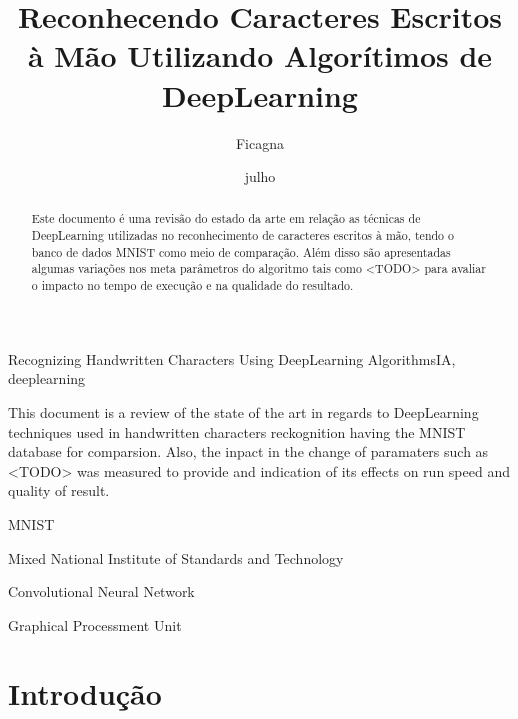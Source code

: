 \documentclass[cic,tc]{iiufrgs}
\title{Reconhecendo Caracteres Escritos à Mão Utilizando Algorítimos de DeepLearning}
\author{Ficagna}{Alan}
\date{julho}{2015}
\begin{document}
\maketitle

\begin{abstract}

  Este documento é uma revisão do estado da arte em relação as técnicas de
DeepLearning utilizadas no reconhecimento de caracteres escritos à mão, tendo o
banco de dados MNIST como meio de comparação. Além disso são apresentadas
algumas variações nos meta parâmetros do algoritmo tais como <TODO> para
avaliar o impacto no tempo de execução e na qualidade do resultado.

\end{abstract}

\begin{englishabstract}{Recognizing Handwritten Characters Using DeepLearning Algorithms}{IA, deeplearning} %

  This document is a review of the state of the art in regards to DeepLearning
techniques used in handwritten characters reckognition having the MNIST
database for comparsion. Also, the inpact in the change of paramaters such as
<TODO> was measured to provide and indication of its effects on run speed and
quality of result.

\end{englishabstract}

\listoffigures
\listoftables
\begin{listofabbrv}{MNIST} %
 \item[MNIST] Mixed National Institute of Standards and Technology
 \item[CNN] Convolutional Neural Network
 \item[GPU] Graphical Processment Unit
\end{listofabbrv}
\tableofcontents

\chapter{Introdução}
\end{document}
